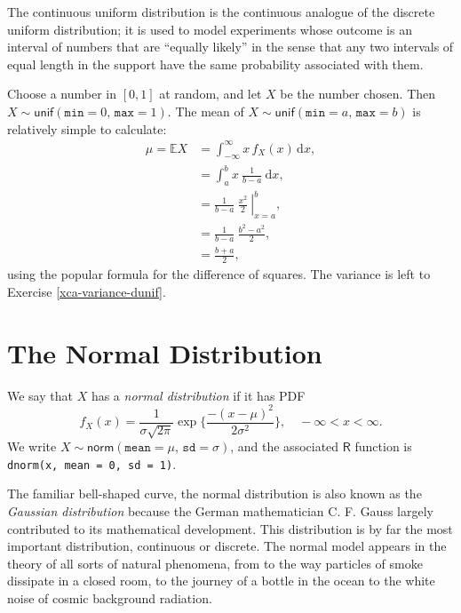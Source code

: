 \documentclass[captions=tableheading]{scrbook}
\begin{document}
The continuous uniform distribution is the continuous analogue of the discrete uniform distribution; it is used to model experiments whose outcome is an interval of numbers that are ``equally likely'' in the sense that any two intervals of equal length in the support have the same probability associated with them.

\begin{example}
Choose a number in \( [0,1] \) at random, and let \(X\) be the number chosen. Then \(X\sim\mathsf{unif}(\mathtt{min}=0,\,\mathtt{max}=1)\).
The mean of \(X\sim\mathsf{unif}(\mathtt{min}=a,\,\mathtt{max}=b)\) is relatively simple to calculate:
\begin{align*}
\mu=\mathbb{E} X & =\int_{-\infty}^{\infty}x\, f_{X}(x)\,\mathrm{d} x,\\
 & =\int_{a}^{b}x\ \frac{1}{b-a}\ \mathrm{d} x,\\
 & =\left.\frac{1}{b-a}\ \frac{x^{2}}{2}\ \right|_{x=a}^{b},\\
 & =\frac{1}{b-a}\ \frac{b^{2}-a^{2}}{2},\\
 & =\frac{b+a}{2},
\end{align*}
using the popular formula for the difference of squares. The variance is left to Exercise \ref{xca-variance-dunif}.
\end{example}
\section{The Normal Distribution}
\label{sec-1-3}
\label{sec-The-Normal-Distribution}


We say that \(X\) has a \emph{normal distribution} if it has PDF
\begin{equation}
f_{X}(x)=\frac{1}{\sigma\sqrt{2\pi}}\exp \{ \frac{-(x-\mu)^{2}}{2\sigma^{2}} \},\quad -\infty < x < \infty.
\end{equation}
We write \(X\sim\mathsf{norm}(\mathtt{mean}=\mu,\,\mathtt{sd}=\sigma)\), and the associated \(\mathsf{R}\) function is \texttt{dnorm(x, mean = 0, sd = 1)}.

The familiar bell-shaped curve, the normal distribution is also known as the \emph{Gaussian distribution} because the German mathematician C. F. Gauss largely contributed to its mathematical development. This distribution is by far the most important distribution, continuous or discrete. The normal model appears in the theory of all sorts of natural phenomena, from to the way particles of smoke dissipate in a closed room, to the journey of a bottle in the ocean to the white noise of cosmic background radiation.
\end{document}
